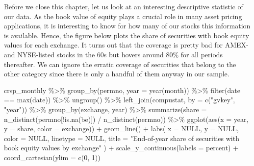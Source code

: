 \documentclass[
]{krantz}
\newenvironment{Shaded}{\begin{snugshade}}{\end{snugshade}}
\newcommand{\AttributeTok}[1]{\textcolor[rgb]{0.61,0.61,0.61}{#1}}
\newcommand{\ConstantTok}[1]{\textcolor[rgb]{0,0,0}{#1}}
\newcommand{\DecValTok}[1]{\textcolor[rgb]{0.06,0.06,0.06}{#1}}
\newcommand{\FunctionTok}[1]{\textcolor[rgb]{0,0,0}{#1}}
\newcommand{\NormalTok}[1]{#1}
\newcommand{\SpecialCharTok}[1]{\textcolor[rgb]{0,0,0}{#1}}
\newcommand{\StringTok}[1]{\textcolor[rgb]{0.5,0.5,0.5}{#1}}
\begin{document}
Before we close this chapter, let us look at an interesting descriptive statistic of our data. As the book value of equity plays a crucial role in many asset pricing applications, it is interesting to know for how many of our stocks this information is available. Hence, the figure below plots the share of securities with book equity values for each exchange. It turns out that the coverage is pretty bad for AMEX- and NYSE-listed stocks in the 60s but hovers around 80\% for all periods thereafter. We can ignore the erratic coverage of securities that belong to the other category since there is only a handful of them anyway in our sample.

\begin{Shaded}
\begin{Highlighting}[]
\NormalTok{crsp\_monthly }\SpecialCharTok{\%\textgreater{}\%}
  \FunctionTok{group\_by}\NormalTok{(permno, }\AttributeTok{year =} \FunctionTok{year}\NormalTok{(month)) }\SpecialCharTok{\%\textgreater{}\%}
  \FunctionTok{filter}\NormalTok{(date }\SpecialCharTok{==} \FunctionTok{max}\NormalTok{(date)) }\SpecialCharTok{\%\textgreater{}\%}
  \FunctionTok{ungroup}\NormalTok{() }\SpecialCharTok{\%\textgreater{}\%}
  \FunctionTok{left\_join}\NormalTok{(compustat, }\AttributeTok{by =} \FunctionTok{c}\NormalTok{(}\StringTok{"gvkey"}\NormalTok{, }\StringTok{"year"}\NormalTok{)) }\SpecialCharTok{\%\textgreater{}\%}
  \FunctionTok{group\_by}\NormalTok{(exchange, year) }\SpecialCharTok{\%\textgreater{}\%}
  \FunctionTok{summarize}\NormalTok{(}\AttributeTok{share =} \FunctionTok{n\_distinct}\NormalTok{(permno[}\SpecialCharTok{!}\FunctionTok{is.na}\NormalTok{(be)]) }\SpecialCharTok{/} \FunctionTok{n\_distinct}\NormalTok{(permno)) }\SpecialCharTok{\%\textgreater{}\%}
  \FunctionTok{ggplot}\NormalTok{(}\FunctionTok{aes}\NormalTok{(}\AttributeTok{x =}\NormalTok{ year, }\AttributeTok{y =}\NormalTok{ share, }\AttributeTok{color =}\NormalTok{ exchange)) }\SpecialCharTok{+}
  \FunctionTok{geom\_line}\NormalTok{() }\SpecialCharTok{+}
  \FunctionTok{labs}\NormalTok{(}
    \AttributeTok{x =} \ConstantTok{NULL}\NormalTok{, }\AttributeTok{y =} \ConstantTok{NULL}\NormalTok{, }\AttributeTok{color =} \ConstantTok{NULL}\NormalTok{, }\AttributeTok{linetype =} \ConstantTok{NULL}\NormalTok{,}
    \AttributeTok{title =} \StringTok{"End{-}of{-}year share of securities with book equity values by exchange"}
\NormalTok{  ) }\SpecialCharTok{+}
  \FunctionTok{scale\_y\_continuous}\NormalTok{(}\AttributeTok{labels =}\NormalTok{ percent) }\SpecialCharTok{+} 
  \FunctionTok{coord\_cartesian}\NormalTok{(}\AttributeTok{ylim =} \FunctionTok{c}\NormalTok{(}\DecValTok{0}\NormalTok{, }\DecValTok{1}\NormalTok{))}
\end{Highlighting}
\end{Shaded}
\end{document}
